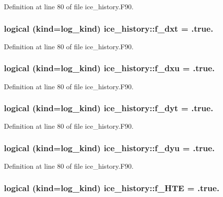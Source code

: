 Definition at line 80 of file ice\_\-history.F90.\hypertarget{namespaceice__history_a6effc6ebe9b5dc7d958341622f11530c}{
\subsubsection[{f\_\-dxt}]{\setlength{\rightskip}{0pt plus 5cm}logical (kind=log\_\-kind) {\bf ice\_\-history::f\_\-dxt} = .true.}}
\label{namespaceice__history_a6effc6ebe9b5dc7d958341622f11530c}


Definition at line 80 of file ice\_\-history.F90.\hypertarget{namespaceice__history_ac2cca9bb022f44a98a6cff9a59cd19e3}{
\subsubsection[{f\_\-dxu}]{\setlength{\rightskip}{0pt plus 5cm}logical (kind=log\_\-kind) {\bf ice\_\-history::f\_\-dxu} = .true.}}
\label{namespaceice__history_ac2cca9bb022f44a98a6cff9a59cd19e3}


Definition at line 80 of file ice\_\-history.F90.\hypertarget{namespaceice__history_a7976eedce7471cfcf14fe54b09e5e2a0}{
\subsubsection[{f\_\-dyt}]{\setlength{\rightskip}{0pt plus 5cm}logical (kind=log\_\-kind) {\bf ice\_\-history::f\_\-dyt} = .true.}}
\label{namespaceice__history_a7976eedce7471cfcf14fe54b09e5e2a0}


Definition at line 80 of file ice\_\-history.F90.\hypertarget{namespaceice__history_a5fe48a0bc8e7dcdbe8689feadd8cdd70}{
\subsubsection[{f\_\-dyu}]{\setlength{\rightskip}{0pt plus 5cm}logical (kind=log\_\-kind) {\bf ice\_\-history::f\_\-dyu} = .true.}}
\label{namespaceice__history_a5fe48a0bc8e7dcdbe8689feadd8cdd70}


Definition at line 80 of file ice\_\-history.F90.\hypertarget{namespaceice__history_ac61273f25f1bb3b60c8cc5c55c8fd490}{
\subsubsection[{f\_\-HTE}]{\setlength{\rightskip}{0pt plus 5cm}logical (kind=log\_\-kind) {\bf ice\_\-history::f\_\-HTE} = .true.}}
\label{namespaceice__history_ac61273f25f1bb3b60c8cc5c55c8fd490}


